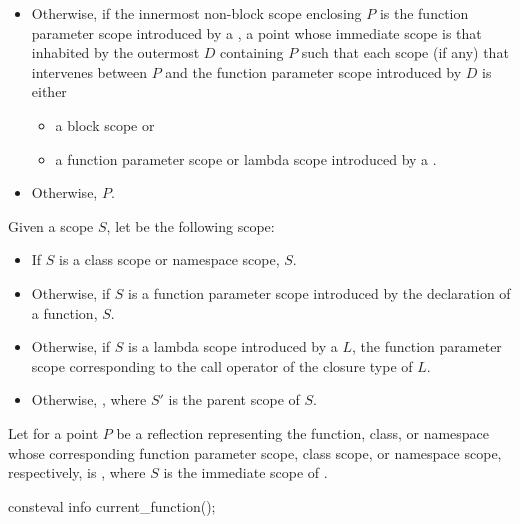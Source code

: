\begin{itemize}
    .
  \item
    Otherwise, if the innermost non-block scope enclosing $P$
    is the function parameter scope
    introduced by a ,
    a point whose immediate scope is that inhabited
    by the outermost  $D$
    containing $P$ such that each scope (if any) that intervenes between $P$
    and the function parameter scope introduced by $D$ is either
    \begin{itemize}
    \item
      a block scope or
    \item
      a function parameter scope or lambda scope
      introduced by a .
    \end{itemize}
  \item
    Otherwise, $P$.
\end{itemize}

\pnum
Given a scope $S$,
let  be the following scope:
\begin{itemize}
\item
  If $S$ is a class scope or namespace scope,
  $S$.
\item
  Otherwise, if $S$ is a function parameter scope
  introduced by the declaration of a function,
  $S$.
\item
  Otherwise, if $S$ is a lambda scope
  introduced by a  $L$,
  the function parameter scope
  corresponding to the call operator of the closure type of $L$.
\item
  Otherwise, ,
  where $S'$ is the parent scope of $S$.
\end{itemize}

\pnum
Let  for a point $P$ be
a reflection representing the function, class, or namespace
whose corresponding
function parameter scope,
class scope, or
namespace scope, respectively,
is ,
where $S$ is the immediate scope of .

%
\begin{itemdecl}
consteval info current_function();
\end{itemdecl}


